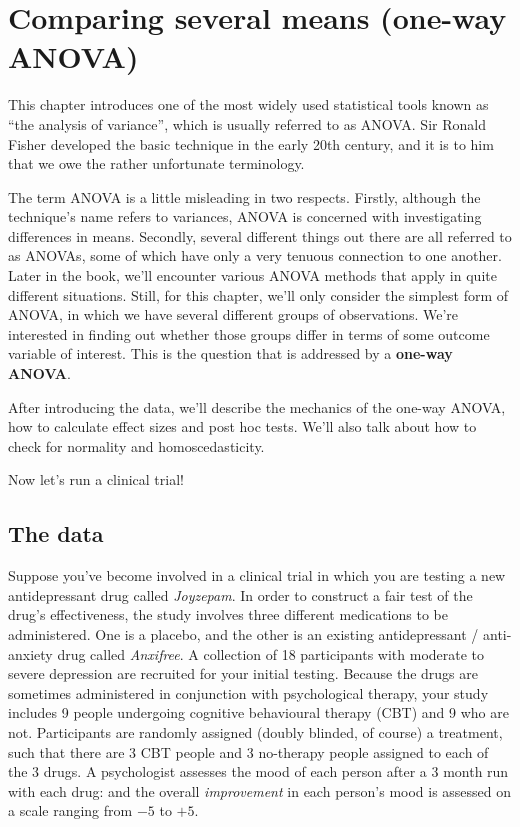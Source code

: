 \documentclass[
]{book}
\theoremstyle{definition}
\theoremstyle{definition}
\theoremstyle{definition}
\theoremstyle{definition}
\theoremstyle{remark}
\begin{document}
\hypertarget{anova}{%
\chapter{Comparing several means (one-way ANOVA)}\label{anova}}

This chapter introduces one of the most widely used statistical tools known as ``the analysis of variance'', which is usually referred to as ANOVA. Sir Ronald Fisher developed the basic technique in the early 20th century, and it is to him that we owe the rather unfortunate terminology.

The term ANOVA is a little misleading in two respects. Firstly, although the technique's name refers to variances, ANOVA is concerned with investigating differences in means. Secondly, several different things out there are all referred to as ANOVAs, some of which have only a very tenuous connection to one another. Later in the book, we'll encounter various ANOVA methods that apply in quite different situations. Still, for this chapter, we'll only consider the simplest form of ANOVA, in which we have several different groups of observations. We're interested in finding out whether those groups differ in terms of some outcome variable of interest. This is the question that is addressed by a \textbf{one-way ANOVA}.

After introducing the data, we'll describe the mechanics of the one-way ANOVA, how to calculate effect sizes and post hoc tests. We'll also talk about how to check for normality and homoscedasticity.

Now let's run a clinical trial!

\hypertarget{the-data}{%
\section{The data}\label{the-data}}

Suppose you've become involved in a clinical trial in which you are testing a new antidepressant drug called \emph{Joyzepam}. In order to construct a fair test of the drug's effectiveness, the study involves three different medications to be administered. One is a placebo, and the other is an existing antidepressant / anti-anxiety drug called \emph{Anxifree}. A collection of 18 participants with moderate to severe depression are recruited for your initial testing. Because the drugs are sometimes administered in conjunction with psychological therapy, your study includes 9 people undergoing cognitive behavioural therapy (CBT) and 9 who are not. Participants are randomly assigned (doubly blinded, of course) a treatment, such that there are 3 CBT people and 3 no-therapy people assigned to each of the 3 drugs. A psychologist assesses the mood of each person after a 3 month run with each drug: and the overall \emph{improvement} in each person's mood is assessed on a scale ranging from \(-5\) to \(+5\).
\end{document}
